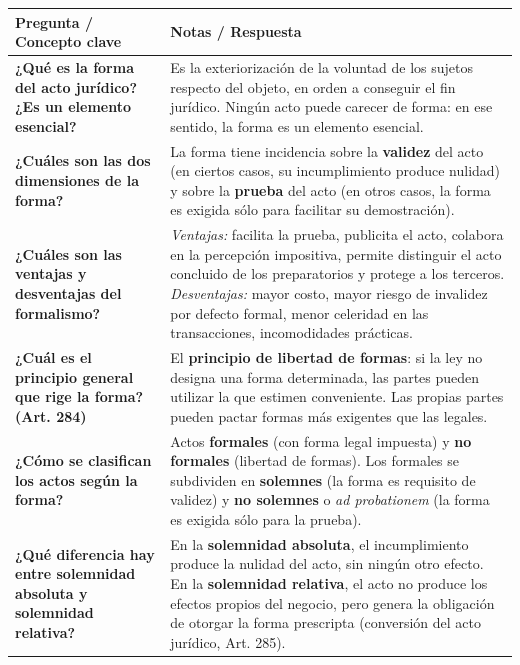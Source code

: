 \documentclass[12pt,oneside]{book}
\begin{document}
\begin{longtable}{@{}     >{\raggedright\arraybackslash}p{}     >{\raggedright\arraybackslash}p{} @{}}
\toprule
\textbf{Pregunta / Concepto clave} &
\textbf{Notas / Respuesta} \\
\midrule

\textbf{¿Qué es la forma del acto jurídico? ¿Es un elemento esencial?} &
Es la exteriorización de la voluntad de los sujetos respecto del objeto, en orden a conseguir el fin jurídico. Ningún acto puede carecer de forma: en ese sentido, la forma es un elemento esencial. \\[6pt]

\textbf{¿Cuáles son las dos dimensiones de la forma?} &
La forma tiene incidencia sobre la \textbf{validez} del acto (en ciertos casos, su incumplimiento produce nulidad) y sobre la \textbf{prueba} del acto (en otros casos, la forma es exigida sólo para facilitar su demostración). \\[6pt]

\textbf{¿Cuáles son las ventajas y desventajas del formalismo?} &
\textit{Ventajas:} facilita la prueba, publicita el acto, colabora en la percepción impositiva, permite distinguir el acto concluido de los preparatorios y protege a los terceros. \textit{Desventajas:} mayor costo, mayor riesgo de invalidez por defecto formal, menor celeridad en las transacciones, incomodidades prácticas. \\[6pt]

\textbf{¿Cuál es el principio general que rige la forma? (Art. 284)} &
El \textbf{principio de libertad de formas}: si la ley no designa una forma determinada, las partes pueden utilizar la que estimen conveniente. Las propias partes pueden pactar formas más exigentes que las legales. \\[6pt]

\textbf{¿Cómo se clasifican los actos según la forma?} &
Actos \textbf{formales} (con forma legal impuesta) y \textbf{no formales} (libertad de formas). Los formales se subdividen en \textbf{solemnes} (la forma es requisito de validez) y \textbf{no solemnes} o \emph{ad probationem} (la forma es exigida sólo para la prueba). \\[6pt]

\textbf{¿Qué diferencia hay entre solemnidad absoluta y solemnidad relativa?} &
En la \textbf{solemnidad absoluta}, el incumplimiento produce la nulidad del acto, sin ningún otro efecto. En la \textbf{solemnidad relativa}, el acto no produce los efectos propios del negocio, pero genera la obligación de otorgar la forma prescripta (conversión del acto jurídico, Art. 285). \\[6pt]


\end{longtable}
\end{document}
